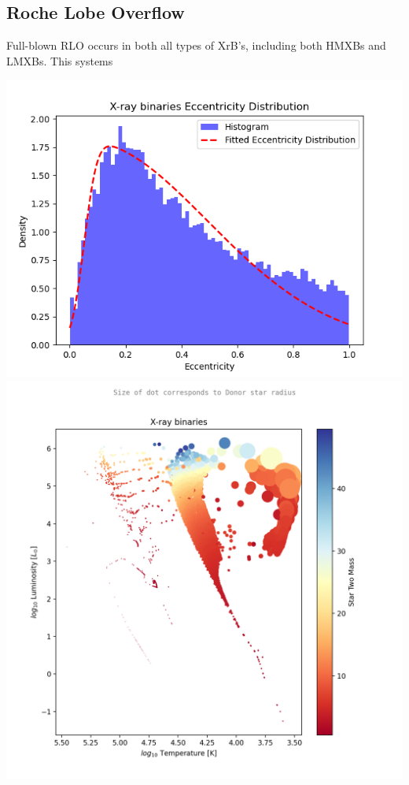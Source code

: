\documentclass[12pt, letterpaper]{article}
\begin{document}
        \subsection{\centering Roche Lobe Overflow}
        Full-blown RLO occurs in both all types of XrB's, including both HMXBs and LMXBs. This systems 
        \begin{center}
            \includegraphics[scale=.5]{Figs/X-ray binaries Eccentricty Distribution.png}
            \includegraphics[scale=.5]{Figs/X-ray binaries S2mass log10 F star radius T.png}

\end{center}
\end{document}
